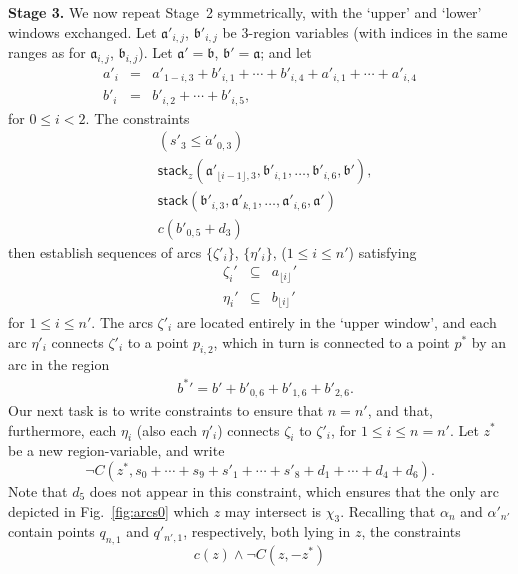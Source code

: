 \documentclass{article}
\newcommand{\set}[1]{\{#1\}}
\newcommand{\tseq}[1]{\mathfrak{#1}}
\newcommand{\intermediate}[1]{\dot{#1}}
\newcommand{\stack}{\mathsf{stack}}
\newcommand{\md}[2][] {{\lfloor#2\rfloor_{#1}}}
\begin{document}
\noindent
\textbf{Stage 3.}  We now repeat Stage~2 symmetrically, with the
`upper' and `lower' windows exchanged. Let $\tseq{a}'_{i,j}$,
$\tseq{b}'_{i,j}$ be 3-region variables (with indices in the same
ranges as for $\tseq{a}_{i,j}$, $\tseq{b}_{i,j}$). Let $\tseq{a}' =
\tseq{b}$, $\tseq{b}' = \tseq{a}$; and let
\begin{eqnarray*}
a'_i & =  & a'_{1-i,3} + b'_{i,1} + \cdots + b'_{i,4} + a'_{i,1} + \cdots + a'_{i,4}\\
b'_i & =  & b'_{i,2} + \cdots + b'_{i,5},
\end{eqnarray*}
for $0 \leq i < 2$. The constraints
\begin{align*}
& (s'_3 \leq \intermediate{a}'_{0,3}) \\
& \stack_z(\tseq{a}'_{\md{i-1},3}, \tseq{b}'_{i,1}, \ldots, \tseq{b}'_{i,6}, \tseq{b}'),\\
& \stack(\tseq{b}'_{i,3}, \tseq{a}'_{k,1}, \ldots, \tseq{a}'_{i,6}, \tseq{a}')\\
& c(b'_{0,5} + d_3)
\end{align*}
then establish sequences of arcs $\set{\zeta'_i}$, $\set{\eta'_i}$,
($1 \leq i \leq n'$) satisfying
\begin{eqnarray*}
\zeta_i' & \subseteq & a_{\md{i}}'\\
\eta_i' & \subseteq & b_{\md{i}}'
\end{eqnarray*}
for $1 \leq i \leq n'$. The arcs $\zeta'_i$ are located entirely in the
`upper window', and each arc $\eta'_i$ connects $\zeta'_i$ to a point
$p_{i,2}$, which in turn is connected to a point $p^*$ by an arc in
the region
\begin{align*}
& {b^*}' = b' + b'_{0,6} + b'_{1,6} + b'_{2,6}.
\end{align*}
Our next task is to write constraints to ensure that $n = n'$, and
that, furthermore, each $\eta_i$ (also each $\eta'_i$) connects
$\zeta_i$ to $\zeta'_i$, for $1\leq i\leq n=n'$. Let $z^*$ be a new
region-variable, and write
\begin{equation*}
\neg C(z^*, s_0 + \cdots + s_9 + s'_1 + \cdots + s'_8 + d_1 + \cdots + d_4 + d_6).
\end{equation*}
Note that $d_5$ does not appear in this constraint, which ensures that
the only arc depicted in Fig.~\ref{fig:arcs0} which $z$ may intersect
is $\chi_3$. Recalling that $\alpha_n$ and $\alpha'_{n'}$ contain
points $q_{n,1}$ and $q'_{n',1}$, respectively, both lying in $z$, the
constraints
\begin{equation*}
c(z) \wedge \neg C(z, -z^*)
\end{equation*}
\end{document}
